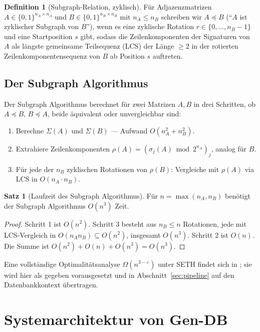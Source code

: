 \documentclass[a4paper,12pt, twoside]{report}
\theoremstyle{definition}
\newtheorem{definition}{Definition}
\newtheorem{satz}{Satz}
\begin{document}
\begin{definition}[Subgraph-Relation, zyklisch]
	Für Adjazenzmatrizen $A \in \{0,1\}^{n_A \times n_A}$ und $B \in \{0,1\}^{n_B \times n_B}$ mit $n_A \le n_B$ schreiben wir $A \preceq B$ (``$A$ ist zyklischer Subgraph von $B$''), wenn es eine zyklische Rotation $r \in \{0,\ldots,n_B-1\}$ und eine Startposition $s$ gibt, sodass die Zeilenkomponenten der Signaturen von $A$ als längste gemeinsame Teilsequenz (LCS) der Länge $\geq 2$ in der rotierten Zeilenkomponentensequenz von $B$ ab Position $s$ auftreten.
\end{definition}

\section{Der Subgraph Algorithmus}

Der Subgraph Algorithmus \cite{epp2026subgraph} berechnet für zwei Matrizen $A, B$ in drei Schritten, ob $A \preceq B$, $B \preceq A$, beide äquivalent oder unvergleichbar sind:

\begin{enumerate}
	\item Berechne $\Sigma(A)$ und $\Sigma(B)$ — Aufwand $O(n_A^2 + n_B^2)$.
	\item Extrahiere Zeilenkomponenten $\rho(A) = (\sigma_j(A) \bmod 2^{n_A})_j$, analog für $B$.
	\item Für jede der $n_B$ zyklischen Rotationen von $\rho(B)$: Vergleiche mit $\rho(A)$ via LCS in $O(n_A \cdot n_B)$.
\end{enumerate}

\begin{satz}[Laufzeit des Subgraph Algorithmus]
	\label{satz:laufzeit}
	Für $n = \max(n_A, n_B)$ benötigt der Subgraph Algorithmus $O(n^3)$ Zeit.
\end{satz}

\begin{proof}
	Schritt 1 ist $O(n^2)$. Schritt 3 besteht aus $n_B \le n$ Rotationen, jede mit LCS-Vergleich in $O(n_A n_B) \subseteq O(n^2)$, insgesamt $O(n^3)$. Schritt 2 ist $O(n)$. Die Summe ist $O(n^2) + O(n) + O(n^3) = O(n^3)$.
\end{proof}

Eine vollständige Optimalitätsanalyse $\Omega(n^{3-\varepsilon})$ unter SETH findet sich in \cite{epp2026subgraph}; sie wird hier als gegeben vorausgesetzt und in Abschnitt~\ref{sec:pipeline} auf den Datenbankkontext übertragen.

\chapter{Systemarchitektur von Gen-DB}
\label{sec:architektur}
\end{document}
